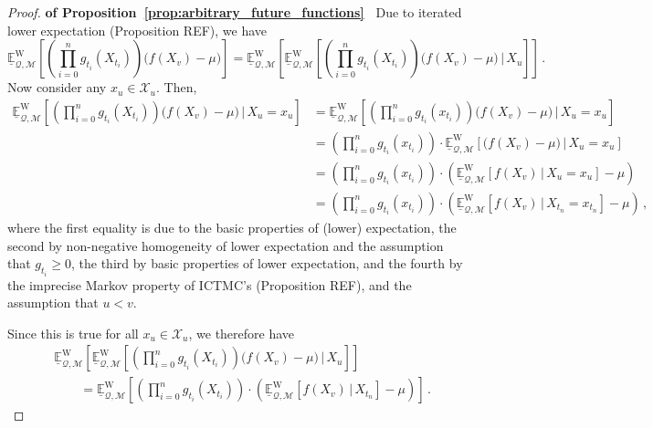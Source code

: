 \documentclass[twoside,11pt]{article}
\newcommand{\states}{\mathcal{X}}
\newcommand{\lexp}{\underline{\mathbb{E}}_{\rateset,\mathcal{M}}^\mathrm{W}}
\newcommand{\rateset}{\mathcal{Q}}
\begin{document}
\begin{proof}{\bf of Proposition~\ref{prop:arbitrary_future_functions}~}
Due to iterated lower expectation (Proposition REF), we have
\begin{equation*}
\lexp\left[\left(\prod_{i=0}^n g_{t_i}(X_{t_i})\right)\bigl(f(X_v) - \mu\bigr)\right] = \lexp\left[\lexp\left[\left(\prod_{i=0}^n g_{t_i}(X_{t_i})\right)\bigl(f(X_v) - \mu\bigr)\,\bigl\vert\,X_u\right]\right]\,.
\end{equation*}
Now consider any $x_u\in\states_u$. Then,
\begin{align*}
\lexp\left[\left(\prod_{i=0}^n g_{t_i}(X_{t_i})\right)\bigl(f(X_v) - \mu\bigr)\,\bigl\vert\,X_u=x_u\right] &= \lexp\left[\left(\prod_{i=0}^n g_{t_i}(x_{t_i})\right)\bigl(f(X_v) - \mu\bigr)\,\bigl\vert\,X_u=x_u\right] \\
&= \left(\prod_{i=0}^n g_{t_i}(x_{t_i})\right)\cdot\lexp\left[\bigl(f(X_v) - \mu\bigr)\,\bigl\vert\,X_u=x_u\right] \\
&= \left(\prod_{i=0}^n g_{t_i}(x_{t_i})\right)\cdot\left(\lexp\left[f(X_v)\,\vert\,X_u=x_u\right] - \mu\right) \\
&= \left(\prod_{i=0}^n g_{t_i}(x_{t_i})\right)\cdot\left(\lexp\left[f(X_v)\,\vert\,X_{t_n}=x_{t_n}\right] - \mu\right)\,,
\end{align*}
where the first equality is due to the basic properties of (lower) expectation, the second by non-negative homogeneity of lower expectation and the assumption that $g_{t_i}\geq 0$, the third by basic properties of lower expectation, and the fourth by the imprecise Markov property of ICTMC's (Proposition REF), and the assumption that $u<v$.

Since this is true for all $x_u\in\states_u$, we therefore have
\begin{align*}
 &\lexp\left[\lexp\left[\left(\prod_{i=0}^n g_{t_i}(X_{t_i})\right)\bigl(f(X_v) - \mu\bigr)\,\bigl\vert\,X_u\right]\right] \\
 &\quad\quad= \lexp\left[\left(\prod_{i=0}^n g_{t_i}(X_{t_i})\right)\cdot\left(\lexp\left[f(X_v)\,\vert\,X_{t_n}\right] - \mu\right)\right]\,.
\end{align*}
\end{proof}
\end{document}
